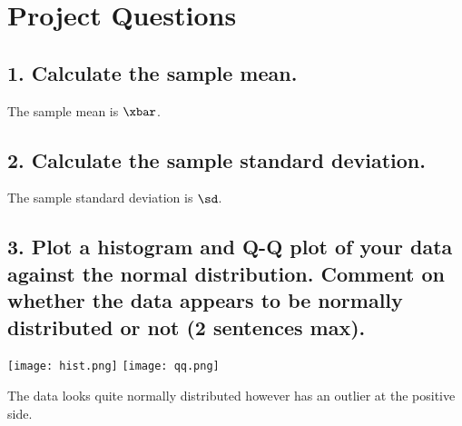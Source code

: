 \documentclass[12pt,oneside]{book}
\begin{document}
\section*{Project Questions}
\hspace*{.02\textwidth}%
\begin{minipage}{.96\textwidth}
\subsection*{1. Calculate the sample mean.}
The sample mean is $\xbar$.

\subsection*{2. Calculate the sample standard deviation.}
The sample standard deviation is $\sd$.

\subsection*{3. Plot a histogram and Q-Q plot of your data against the normal distribution. Comment
on whether the data appears to be normally distributed or not (2 sentences max).}
\begin{center}
\texttt{[image: hist.png]}
\texttt{[image: qq.png]}
\end{center}
The data looks quite normally distributed however has an outlier at the positive side.
\end{minipage}%
\newpage
\end{document}
